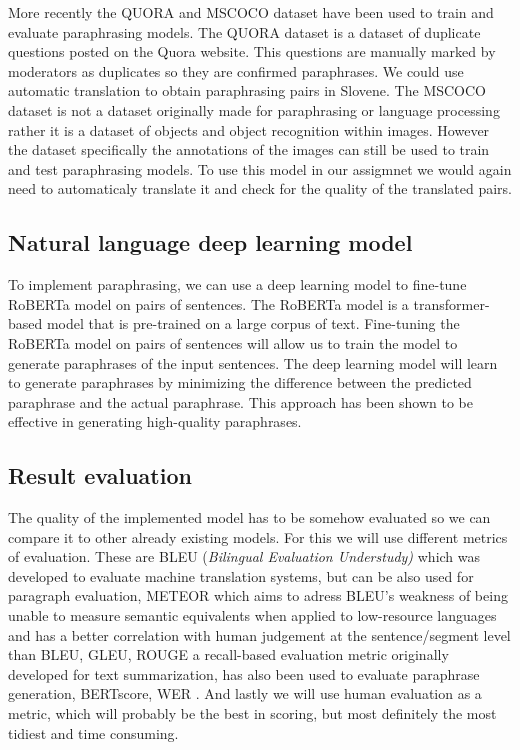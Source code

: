 \documentclass[fleqn,moreauthors,10pt]{ds_report}
\begin{document}
More recently the QUORA\cite{sambit7_quora_dataset} and MSCOCO\cite{lin2014microsoft} dataset have been used to train and evaluate paraphrasing models. The QUORA dataset is a dataset of duplicate questions posted on the Quora website. This questions are manually marked by moderators as duplicates so they are confirmed paraphrases. We could use automatic translation to obtain paraphrasing pairs in Slovene. The MSCOCO dataset is not a dataset originally made for paraphrasing or language processing rather it is a dataset of objects and object recognition within images. However the dataset specifically the annotations of the images can still be used to train and test paraphrasing models. To use this model in our assigmnet we would again need to automaticaly translate it and check for the quality of the translated pairs.

\subsection{Natural language deep learning model}
To implement paraphrasing, we can use a deep learning model to fine-tune RoBERTa model on pairs of sentences. The RoBERTa model is a transformer-based model that is pre-trained on a large corpus of text. Fine-tuning the RoBERTa model on pairs of sentences will allow us to train the model to generate paraphrases of the input sentences. The deep learning model will learn to generate paraphrases by minimizing the difference between the predicted paraphrase and the actual paraphrase. This approach has been shown to be effective in generating high-quality paraphrases.

\subsection{Result evaluation}
The quality of the implemented model has to be somehow evaluated so we can compare it to other already existing models. For this we will use different metrics of evaluation. These are BLEU (\textit{Bilingual Evaluation Understudy)} which was developed to evaluate machine translation systems, but can be also used for paragraph evaluation, METEOR which aims to adress BLEU's weakness of being unable to measure semantic equivalents when applied to low-resource languages and has a better correlation with human judgement at the sentence/segment level than BLEU, GLEU, ROUGE a recall-based evaluation metric originally developed for text summarization, has also been used to evaluate paraphrase generation, BERTscore, WER \cite{zhou2021paraphrase}. And lastly we will use human evaluation as a metric, which will probably be the best in scoring, but most definitely the most tidiest and time consuming.
\end{document}
